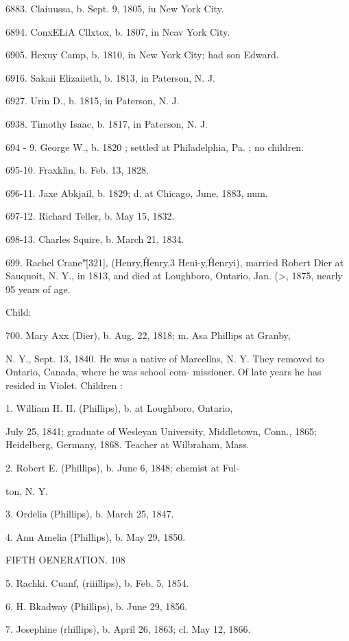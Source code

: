 6883. Claiuussa, b. Sept. 9, 1805, iu New York City. 

6894. ConxELiA Cllxtox, b. 1807, in Ncav York City. 

6905. Hexuy Camp, b. 1810, in New York City; had son Edward. 

6916. Sakaii Elizaiieth, b. 1813, in Paterson, N. J. 

6927. Urin D., b. 1815, in Paterson, N. J. 

6938. Timothy Isaac, b. 1817, in Paterson, N. J. 

694 - 9. George W., b. 1820 ; settled at Philadelphia, Pa. ; no children. 

695-10. Fraxklin, b. Feb. 13, 1828. 

696-11. Jaxe Abkjail, b. 1829; d. at Chicago, June, 1883, num. 

697-12. Richard Teller, b. May 15, 1832. 

698-13. Charles Squire, b. March 21, 1834. 

699. Rachel Crane"\^ [321], (Henry,\^ Henry,3 Heni-y,\^ 
Henryi), married Robert Dier at Sauquoit, N. Y., in 1813, and 
died at Loughboro, Ontario, Jan. (>, 1875, nearly 95 years of age. 

Child: 

700. Mary Axx (Dier), b. Aug. 22, 1818; m. Asa Phillips at Granby, 

N. Y., Sept. 13, 1840. He was a native of Marcellns, N. Y. 
They removed to Ontario, Canada, where he was school com- 
missioner. Of late years he has resided in Violet. Children : 

1. William H. II. (Phillips), b. at Loughboro, Ontario, 

July 25, 1841; graduate of Wesleyan University, 
Middletown, Conn., 1865; Heidelberg, Germany, 1868. 
Teacher at Wilbraham, Mass. 

2. Robert E. (Phillips), b. June 6, 1848; chemist at Ful- 

ton, N. Y. 

3. Ordelia (Phillips), b. March 25, 1847. 

4. Ann Amelia (Phillips), b. May 29, 1850. 



FIFTH OENERATION. 108 

5. Rachki. Cuanf, (riiillips), b. Feb. 5, 1854. 

6. H. Bkadway (Phillips), b. June 29, 1856. 

7. Josephine (rhillips), b. April 26, 1863; cl. May 12, 1866. 

